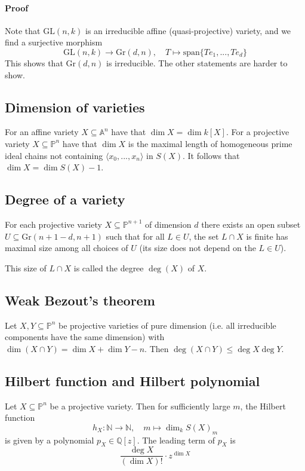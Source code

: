 \documentclass{scrartcl}
\newcommand{\N}{\mathbb{N}}
\newcommand{\Q}{\mathbb{Q}}
\begin{document}
\paragraph{Proof}
Note that $\mathrm{GL}(n, k)$ is an irreducible affine (quasi-projective) variety, and we find a surjective morphism
\begin{equation*}
    \mathrm{GL}(n, k) \to \mathrm{Gr}(d, n), \quad T \mapsto \mathrm{span}\{T e_1, ..., T e_d\}
\end{equation*}
This shows that $\mathrm{Gr}(d, n)$ is irreducible. The other statements are harder to show.

\subsection{Dimension of varieties}
For an affine variety $X \subseteq \mathbb{A}^n$ have that $\dim X = \dim k[X]$.
For a projective variety $X \subseteq \mathbb{P}^n$ have that $\dim X$ is the maximal length of homogeneous prime ideal chains not containing $\langle x_0, ..., x_n \rangle$ in $S(X)$.
It follows that $\dim X = \dim S(X) - 1$.

\subsection{Degree of a variety}
For each projective variety $X \subseteq \mathbb{P}^{n + 1}$ of dimension $d$ there exists an open subset $U \subseteq \mathrm{Gr}(n + 1 - d, n + 1)$ such that for all $L \in U$, the set $L \cap X$ is finite has maximal size among all choices of $U$ (its size does not depend on the $L \in U$).

This size of $L \cap X$ is called the degree $\deg(X)$ of $X$.

\subsection{Weak Bezout's theorem}
Let $X, Y \subseteq \mathbb{P}^n$ be projective varieties of pure dimension (i.e. all irreducible components have the same dimension) with $\dim(X \cap Y) = \dim X + \dim Y - n$.
Then $\deg(X \cap Y) \leq \deg X \deg Y$.

\subsection{Hilbert function and Hilbert polynomial}
Let $X \subseteq \mathbb{P}^n$ be a projective variety. Then for sufficiently large $m$, the Hilbert function
\begin{equation*}
    h_X: \N \to \N, \quad m \mapsto \dim_k S(X)_m
\end{equation*}
is given by a polynomial $p_X \in \Q[z]$. The leading term of $p_X$ is
\begin{equation*}
    \frac {\deg X} {(\dim X)!} \cdot z^{\dim X}
\end{equation*}
\end{document}

